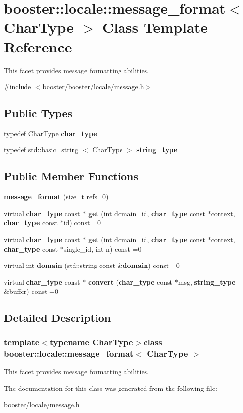 \section{booster\-:\-:locale\-:\-:message\-\_\-format$<$ \-Char\-Type $>$ \-Class \-Template \-Reference}
\label{classbooster_1_1locale_1_1message__format}


\-This facet provides message formatting abilities.  




{\ttfamily \#include $<$booster/booster/locale/message.\-h$>$}

\subsection*{\-Public \-Types}
\begin{DoxyCompactItemize}
\item 
typedef \-Char\-Type {\bf char\-\_\-type}
\item 
typedef std\-::basic\-\_\-string\*
$<$ \-Char\-Type $>$ {\bf string\-\_\-type}
\end{DoxyCompactItemize}
\subsection*{\-Public \-Member \-Functions}
\begin{DoxyCompactItemize}
\item 
{\bf message\-\_\-format} (size\-\_\-t refs=0)
\item 
virtual {\bf char\-\_\-type} const $\ast$ {\bf get} (int domain\-\_\-id, {\bf char\-\_\-type} const $\ast$context, {\bf char\-\_\-type} const $\ast$id) const =0
\item 
virtual {\bf char\-\_\-type} const $\ast$ {\bf get} (int domain\-\_\-id, {\bf char\-\_\-type} const $\ast$context, {\bf char\-\_\-type} const $\ast$single\-\_\-id, int n) const =0
\item 
virtual int {\bf domain} (std\-::string const \&{\bf domain}) const =0
\item 
virtual {\bf char\-\_\-type} const $\ast$ {\bf convert} ({\bf char\-\_\-type} const $\ast$msg, {\bf string\-\_\-type} \&buffer) const =0
\end{DoxyCompactItemize}


\subsection{\-Detailed \-Description}
\subsubsection*{template$<$typename \-Char\-Type$>$class booster\-::locale\-::message\-\_\-format$<$ Char\-Type $>$}

\-This facet provides message formatting abilities. 

\-The documentation for this class was generated from the following file\-:\begin{DoxyCompactItemize}
\item 
booster/locale/message.\-h\end{DoxyCompactItemize}
